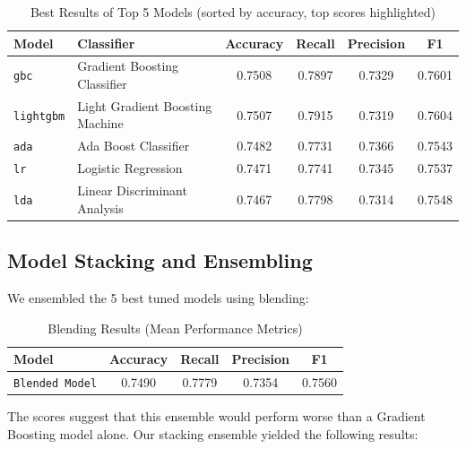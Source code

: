 \documentclass[a4paper,12pt]{article}
\begin{document}
\begin{table}[H]
\centering
\begin{tabular}{l l c c c c}
\toprule
\textbf{Model} & \textbf{Classifier} & \textbf{Accuracy} & \textbf{Recall} & \textbf{Precision} & \textbf{F1} \\
\midrule
\texttt{gbc}    & Gradient Boosting Classifier & \cellcolor{yellow}0.7508 & 0.7897 & 0.7329 & 0.7601 \\  %
\texttt{lightgbm} & Light Gradient Boosting Machine & 0.7507 & \cellcolor{yellow}0.7915 & 0.7319 & \cellcolor{yellow}0.7604 \\  %
\texttt{ada} & Ada Boost Classifier & 0.7482 & 0.7731 & \cellcolor{yellow}0.7366 & 0.7543 \\ %
\texttt{lr} & Logistic Regression & 0.7471 & 0.7741 & 0.7345 & 0.7537 \\  %
\texttt{lda} & Linear Discriminant Analysis & 0.7467 & 0.7798 & 0.7314 & 0.7548 \\ %
\bottomrule
\end{tabular}
\caption{Best Results of Top 5 Models (sorted by accuracy, top scores highlighted)}
\label{tab:best_model_performance}
\end{table}


\subsection{Model Stacking and Ensembling}

We ensembled the 5 best tuned models using blending:

\begin{table}[H]
    \centering
    \begin{tabular}{l c c c c}
    \toprule
    \textbf{Model} & \textbf{Accuracy} & \textbf{Recall} & \textbf{Precision} & \textbf{F1} \\
    \midrule
    \texttt{Blended Model} & 0.7490 & 0.7779 & 0.7354 & 0.7560 \\
    \bottomrule
    \end{tabular}
    \caption{Blending Results (Mean Performance Metrics)}
    \label{tab:blending_performance}
\end{table}

The scores suggest that this ensemble would perform worse than a Gradient Boosting model alone.
Our stacking ensemble yielded the following results:
\end{document}
